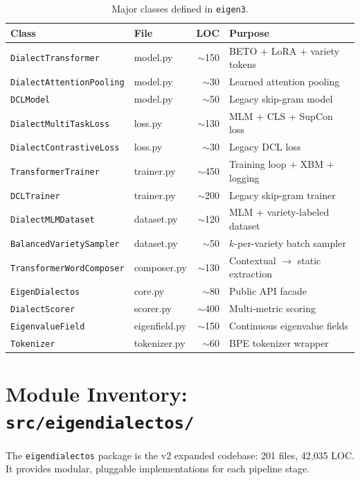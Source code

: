\documentclass[11pt,a4paper]{article}
\begin{document}
\begin{table}[H]
\centering
\caption{Major classes defined in \texttt{eigen3}.}
\small
\begin{tabular}{@{}llrl@{}}
\toprule
\textbf{Class} & \textbf{File} & \textbf{LOC} & \textbf{Purpose} \\
\midrule
\texttt{DialectTransformer} & model.py & $\sim$150 & BETO + LoRA + variety tokens \\
\texttt{DialectAttentionPooling} & model.py & $\sim$30 & Learned attention pooling \\
\texttt{DCLModel} & model.py & $\sim$50 & Legacy skip-gram model \\
\texttt{DialectMultiTaskLoss} & loss.py & $\sim$130 & MLM + CLS + SupCon loss \\
\texttt{DialectContrastiveLoss} & loss.py & $\sim$30 & Legacy DCL loss \\
\texttt{TransformerTrainer} & trainer.py & $\sim$450 & Training loop + XBM + logging \\
\texttt{DCLTrainer} & trainer.py & $\sim$200 & Legacy skip-gram trainer \\
\texttt{DialectMLMDataset} & dataset.py & $\sim$120 & MLM + variety-labeled dataset \\
\texttt{BalancedVarietySampler} & dataset.py & $\sim$50 & $k$-per-variety batch sampler \\
\texttt{TransformerWordComposer} & composer.py & $\sim$130 & Contextual $\to$ static extraction \\
\texttt{EigenDialectos} & core.py & $\sim$80 & Public API facade \\
\texttt{DialectScorer} & scorer.py & $\sim$400 & Multi-metric scoring \\
\texttt{EigenvalueField} & eigenfield.py & $\sim$150 & Continuous eigenvalue fields \\
\texttt{Tokenizer} & tokenizer.py & $\sim$60 & BPE tokenizer wrapper \\
\bottomrule
\end{tabular}
\end{table}


\section{Module Inventory: \texttt{src/eigendialectos/}}

The \texttt{eigendialectos} package is the v2 expanded codebase: 201 files, 42{,}035 LOC.
It provides modular, pluggable implementations for each pipeline stage.
\end{document}
